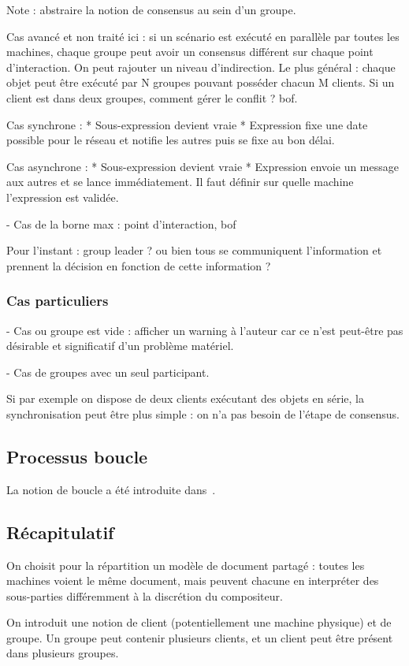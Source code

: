 \documentclass{article}
\newcommand\trigger{point d'interaction\xspace}
\begin{document}
Note : abstraire la notion de consensus au sein d'un groupe.

Cas avancé et non traité ici : si un scénario est exécuté en parallèle par toutes les machines, chaque groupe peut avoir un consensus différent sur chaque \trigger.
On peut rajouter un niveau d'indirection. Le plus général : chaque objet peut être exécuté par N groupes pouvant posséder chacun M clients.
Si un client est dans deux groupes, comment gérer le conflit ? bof.


Cas synchrone : 
* Sous-expression devient vraie
* Expression fixe une date possible pour le réseau et notifie les autres puis se fixe au bon délai.

Cas asynchrone : 
* Sous-expression devient vraie
* Expression envoie un message aux autres et se lance immédiatement.
Il faut définir sur quelle machine l'expression est validée.

- Cas de la borne max : \trigger, bof

Pour l'instant : group leader ? ou bien tous se communiquent l'information et prennent la décision en fonction de cette information ?


\subsubsection{Cas particuliers}
- Cas ou groupe est vide : afficher un warning à l'auteur car ce n'est peut-être pas désirable et significatif d'un problème matériel.


- Cas de groupes avec un seul participant.

Si par exemple on dispose de deux clients exécutant des objets en série,
la synchronisation peut être plus simple : on n'a pas besoin de l'étape de consensus.
\subsection{Processus boucle}
La notion de boucle a été introduite dans~\cite{celerier2016graphical}.

\subsection{Récapitulatif}
On choisit pour la répartition un modèle de document partagé : toutes les machines voient le même document, mais peuvent chacune en interpréter des sous-parties différemment à la discrétion du compositeur.

On introduit une notion de client (potentiellement une machine physique) et de groupe.
Un groupe peut contenir plusieurs clients, et un client peut être présent dans plusieurs groupes.
\end{document}
